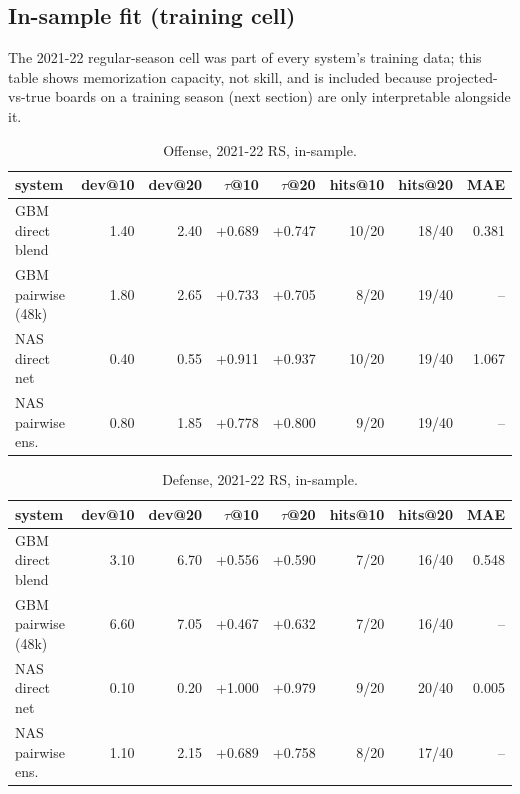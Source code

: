 \documentclass[10pt]{article}
\begin{document}
\subsection{In-sample fit (training cell)}
The 2021-22 regular-season cell was part of every system's training data; this table shows memorization capacity, not skill, and is included because projected-vs-true boards on a training season (next section) are only interpretable alongside it.
\begin{table}[ht]\centering\small
\caption{Offense, 2021-22 RS, in-sample.}\label{tab:train-offense}
\begin{tabular}{lrrrrrrr}
\toprule
system & dev@10 & dev@20 & $\tau$@10 & $\tau$@20 & hits@10 & hits@20 & MAE \\
\midrule
GBM direct blend & 1.40 & 2.40 & +0.689 & +0.747 & 10/20 & 18/40 & 0.381 \\
GBM pairwise (48k) & 1.80 & 2.65 & +0.733 & +0.705 & 8/20 & 19/40 & -- \\
NAS direct net & 0.40 & 0.55 & +0.911 & +0.937 & 10/20 & 19/40 & 1.067 \\
NAS pairwise ens. & 0.80 & 1.85 & +0.778 & +0.800 & 9/20 & 19/40 & -- \\
\bottomrule
\end{tabular}
\end{table}
\begin{table}[ht]\centering\small
\caption{Defense, 2021-22 RS, in-sample.}\label{tab:train-defense}
\begin{tabular}{lrrrrrrr}
\toprule
system & dev@10 & dev@20 & $\tau$@10 & $\tau$@20 & hits@10 & hits@20 & MAE \\
\midrule
GBM direct blend & 3.10 & 6.70 & +0.556 & +0.590 & 7/20 & 16/40 & 0.548 \\
GBM pairwise (48k) & 6.60 & 7.05 & +0.467 & +0.632 & 7/20 & 16/40 & -- \\
NAS direct net & 0.10 & 0.20 & +1.000 & +0.979 & 9/20 & 20/40 & 0.005 \\
NAS pairwise ens. & 1.10 & 2.15 & +0.689 & +0.758 & 8/20 & 17/40 & -- \\
\bottomrule
\end{tabular}
\end{table}
\end{document}

